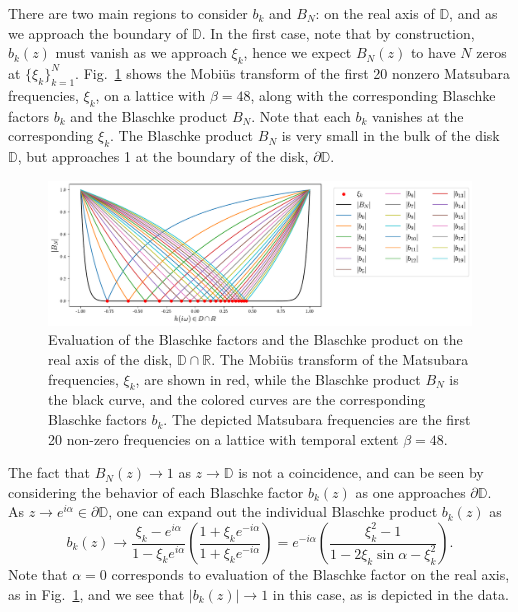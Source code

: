 \begin{appendices}
There are two main regions to consider $b_k$ and $B_N$: on the real axis of $\mathbb D$, and as we approach the boundary of $\mathbb D$. In the first case, note that by construction, $b_k(z)$ must vanish as we approach $\xi_k$, hence we expect $B_N(z)$ to have $N$ zeros at $\{\xi_k\}_{k = 1}^N$. Fig.~\ref{fig:blaschke_real_axis} shows the Mobi\"us transform of the first 20 nonzero Matsubara frequencies, $\xi_k$, on a lattice with $\beta = 48$, along with the corresponding Blaschke factors $b_k$ and the Blaschke product $B_N$. Note that each $b_k$ vanishes at the corresponding $\xi_k$. The Blaschke product $B_N$ is very small in the bulk of the disk $\mathbb D$, but approaches 1 at the boundary of the disk, $\partial\mathbb D$. 

\begin{figure}[!htp]
    \centering
    \includegraphics[width = \textwidth]{figs/blashke_real_axis.pdf}
    \caption{Evaluation of the Blaschke factors and the Blaschke product on the real axis of the disk, $\mathbb D\cap \mathbb R$. The Mobi\"us transform of the Matsubara frequencies, $\xi_k$, are shown in red, while the Blaschke product $B_N$ is the black curve, and the colored curves are the corresponding Blaschke factors $b_k$. The depicted Matsubara frequencies are the first 20 non-zero frequencies on a lattice with temporal extent $\beta = 48$. }
    \label{fig:blaschke_real_axis}
\end{figure}

The fact that $B_N(z)\rightarrow 1$ as $z\rightarrow \mathbb D$ is not a coincidence, and can be seen by considering the behavior of each Blaschke factor $b_k(z)$ as one approaches $\partial \mathbb D$. As $z\rightarrow e^{i\alpha}\in\partial\mathbb D$, one can expand out the individual Blaschke product $b_k(z)$ as
\begin{equation}
    b_k(z) \rightarrow \frac{\xi_k - e^{i\alpha}}{1 - \xi_k e^{i\alpha}} \left( \frac{1 + \xi_k e^{-i\alpha}}{1 + \xi_k e^{-i\alpha}} \right) = e^{-i\alpha} \left( \frac{\xi_k^2 - 1}{1 - 2\xi_k \sin\alpha - \xi_k^2} \right).
\end{equation}
Note that $\alpha = 0$ corresponds to evaluation of the Blaschke factor on the real axis, as in Fig.~\ref{fig:blaschke_real_axis}, and we see that $|b_k(z)|\rightarrow 1$ in this case, as is depicted in the data. 


\end{appendices}
